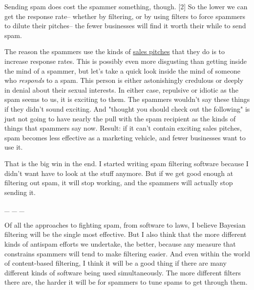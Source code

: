 Sending spam does cost
                    the spammer something, though. [2] So the lower we can get
                    the response rate-- whether by filtering, or by using
                    filters to force spammers to dilute their pitches-- the
                    fewer businesses will find it worth their while to send
                    spam.

The reason the spammers use the kinds of
                    \href{http://www.milliondollaremails.com}{sales pitches}
                    that they do is to increase response rates. This is possibly
                    even more disgusting than getting inside the mind of a
                    spammer, but let's take a quick look inside the mind of
                    someone who \emph{responds} to a spam. This person is either
                    astonishingly credulous or deeply in denial about their
                    sexual interests. In either case, repulsive or idiotic as
                    the spam seems to us, it is exciting to them. The spammers
                    wouldn't say these things if they didn't sound exciting. And
                    "thought you should check out the following" is just not
                    going to have nearly the pull with the spam recipient as the
                    kinds of things that spammers say now. Result: if it can't
                    contain exciting sales pitches, spam becomes less effective
                    as a marketing vehicle, and fewer businesses want to use
                    it.

That is the big win in the end. I started
                    writing spam filtering software because I didn't want have
                    to look at the stuff anymore. But if we get good enough at
                    filtering out spam, it will stop working, and the spammers
                    will actually stop sending it.


                    \_ \_ \_
                    

Of all the approaches to fighting spam, from
                    software to laws, I believe Bayesian filtering will be the
                    single most effective. But I also think that the more
                    different kinds of antispam efforts we undertake, the
                    better, because any measure that constrains spammers will
                    tend to make filtering easier. And even within the world of
                    content-based filtering, I think it will be a good thing if
                    there are many different kinds of software being used
                    simultaneously. The more different filters there are, the
                    harder it will be for spammers to tune spams to get through
                    them.




